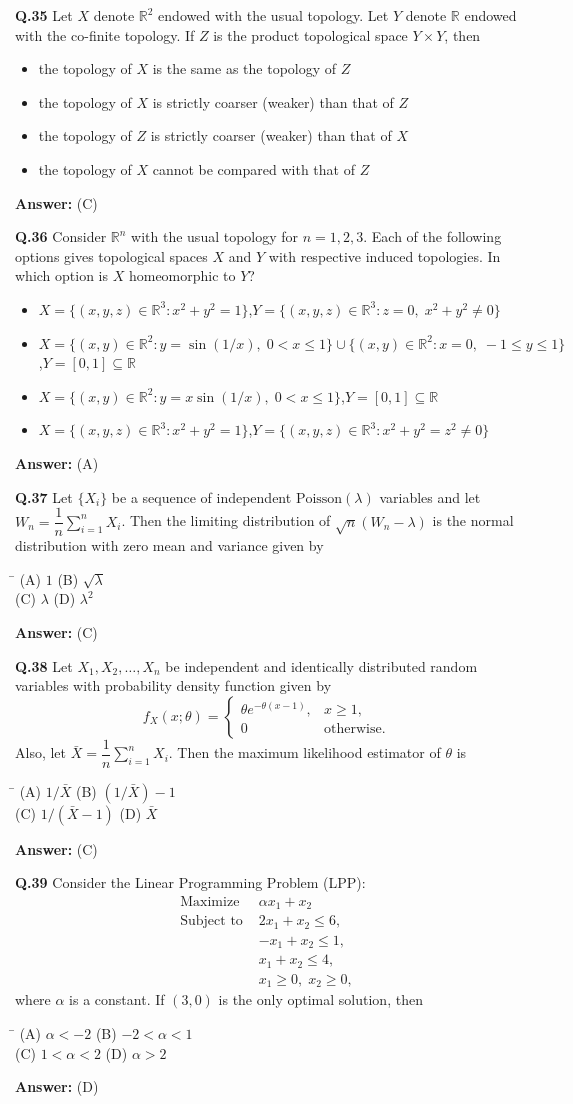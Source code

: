 \documentclass[11pt,a4paper]{article}
\newcommand{\optsfourA}[4]{%
  \begin{tabbing}
    \hspace{0.48\linewidth}\=\kill
    (A) #1 \> (B) #2 \\[2pt]
    (C) #3 \> (D) #4
  \end{tabbing}%
}
\newcommand{\optslistA}[4]{%
  \begin{itemize}
    \setlength{\itemsep}{2pt}\setlength{\parskip}{0pt}
    \item[(A)] #1
    \item[(B)] #2
    \item[(C)] #3
    \item[(D)] #4
  \end{itemize}%
}
\newcommand{\ans}[1]{\textbf{Answer:} #1\par\medskip}
\begin{document}
\textbf{Q.35} Let $X$ denote $\mathbb{R}^2$ endowed with the usual topology. Let $Y$ denote $\mathbb{R}$ endowed with the co-finite topology. If $Z$ is the product topological space $Y \times Y$, then
\optslistA{the topology of $X$ is the same as the topology of $Z$}{the topology of $X$ is strictly coarser (weaker) than that of $Z$}{the topology of $Z$ is strictly coarser (weaker) than that of $X$}{the topology of $X$ cannot be compared with that of $Z$}
\ans{(C)}

\textbf{Q.36} Consider $\mathbb{R}^n$ with the usual topology for $n = 1, 2, 3$. Each of the following options gives topological spaces $X$ and $Y$ with respective induced topologies. In which option is $X$ homeomorphic to $Y$?
\optslistA{$X = \{(x, y, z) \in \mathbb{R}^3 : x^2 + y^2 = 1\}$,\quad $Y = \{(x, y, z) \in \mathbb{R}^3 : z = 0,\; x^2 + y^2 \neq 0\}$}{$X = \{(x, y) \in \mathbb{R}^2 : y = \sin(1/x),\; 0 < x \le 1\} \cup \{(x, y) \in \mathbb{R}^2 : x = 0,\; -1 \le y \le 1\}$,\quad $Y = [0, 1] \subseteq \mathbb{R}$}{$X = \{(x, y) \in \mathbb{R}^2 : y = x\sin(1/x),\; 0 < x \le 1\}$,\quad $Y = [0, 1] \subseteq \mathbb{R}$}{$X = \{(x, y, z) \in \mathbb{R}^3 : x^2 + y^2 = 1\}$,\quad $Y = \{(x, y, z) \in \mathbb{R}^3 : x^2 + y^2 = z^2 \neq 0\}$}
\ans{(A)}

\textbf{Q.37} Let $\{X_i\}$ be a sequence of independent $\text{Poisson}(\lambda)$ variables and let $W_n = \dfrac{1}{n} \sum_{i=1}^{n} X_i$. Then the limiting distribution of $\sqrt{n}(W_n - \lambda)$ is the normal distribution with zero mean and variance given by
\optsfourA{$1$}{$\sqrt{\lambda}$}{$\lambda$}{$\lambda^2$}
\ans{(C)}

\textbf{Q.38} Let $X_1, X_2, \dots, X_n$ be independent and identically distributed random variables with probability density function given by
\[
  f_X(x; \theta) = \begin{cases} \theta e^{-\theta(x - 1)}, & x \ge 1, \\ 0 & \text{otherwise.} \end{cases}
\]
Also, let $\bar{X} = \dfrac{1}{n} \sum_{i=1}^{n} X_i$. Then the maximum likelihood estimator of $\theta$ is
\optsfourA{$1/\bar{X}$}{$(1/\bar{X}) - 1$}{$1/(\bar{X} - 1)$}{$\bar{X}$}
\ans{(C)}

\textbf{Q.39} Consider the Linear Programming Problem (LPP):
\begin{align*}
  \text{Maximize } & \alpha x_1 + x_2 \\
  \text{Subject to } & 2x_1 + x_2 \le 6, \\
                     & -x_1 + x_2 \le 1, \\
                     & x_1 + x_2 \le 4, \\
                     & x_1 \ge 0,\; x_2 \ge 0,
\end{align*}
where $\alpha$ is a constant. If $(3, 0)$ is the only optimal solution, then
\optsfourA{$\alpha < -2$}{$-2 < \alpha < 1$}{$1 < \alpha < 2$}{$\alpha > 2$}
\ans{(D)}
\end{document}

